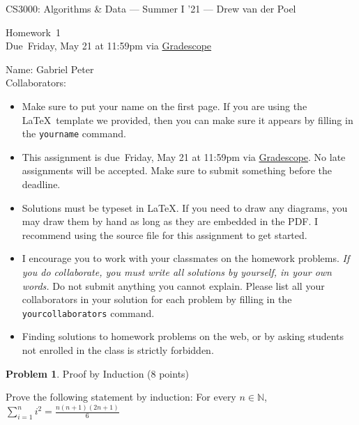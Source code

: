 \documentclass[11pt]{article}
\newcommand{\yourname}{Gabriel Peter}
\newcommand{\yourcollaborators}{}
\newcommand{\N}{\mathbb{N}}
\theoremstyle{definition}
\newcommand{\instructor}{Drew van der Poel}
\newcommand{\hwnum}{1}
\newcommand{\hwdue}{Friday, May 21 at 11:59pm via \href{https://gradescope.com/courses/266585}{Gradescope}}
\theoremstyle{theorem}
\newtheorem{prob}{Problem}
\begin{document}
{\Large 
\begin{center}{CS3000: Algorithms \& Data} --- Summer I '21 --- \instructor \end{center}}
{\large
\vspace{10pt}
\noindent Homework~\hwnum \vspace{2pt}\\
Due~\hwdue}

\bigskip
{\large
\noindent Name: \yourname \vspace{2pt}\\ Collaborators: \yourcollaborators}

\vspace{15pt}
\begin{itemize}

\item Make sure to put your name on the first page.  If you are using the \LaTeX~template we provided, then you can make sure it appears by filling in the \texttt{yourname} command.

\item This assignment is due~\hwdue.  No late assignments will be accepted.  Make sure to submit something before the deadline.

\item Solutions must be typeset in \LaTeX.  If you need to draw any diagrams, you may draw them by hand as long as they are embedded in the PDF.  I recommend using the source file for this assignment to get started.

\item I encourage you to work with your classmates on the homework problems. \emph{If you do collaborate, you must write all solutions by yourself, in your own words.}  Do not submit anything you cannot explain.  Please list all your collaborators in your solution for each problem by filling in the \texttt{yourcollaborators} command.

\item Finding solutions to homework problems on the web, or by asking students not enrolled in the class is strictly forbidden.

\end{itemize}

\newpage

\begin{prob} Proof by Induction (8 points) \end{prob}


Prove the following statement by induction: For every $n \in \N$, $\sum_{i=1}^{n} i^2 = \frac{n(n+1)(2n+1)}{6}$
\end{document}
